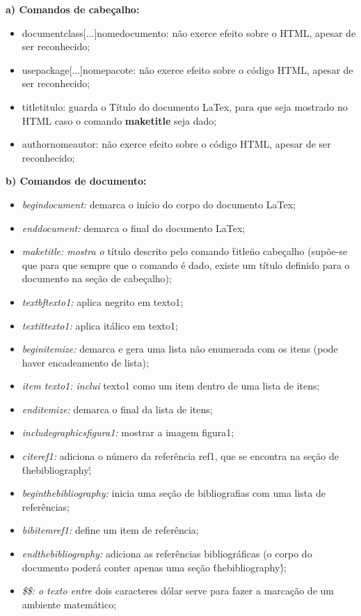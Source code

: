 \documentclass{article}
\begin{document}
\begin{itemzie}

	\item \textbf{a) Comandos de cabeçalho:}
		\begin{itemize}
			 \item documentclass[...]{nomedocumento}: não exerce efeito sobre o HTML, apesar de ser reconhecido;
			 \item usepackage[...]{nomepacote}:  não exerce efeito sobre o código HTML, apesar de ser reconhecido;
			 \item title{titulo}: guarda o Título do documento LaTex, para que seja mostrado no HTML caso o comando \textbf{maketitle} seja dado;
			 \item author{nomeautor}: não exerce efeito sobre o código HTML, apesar de ser reconhecido;
		\end{itemize}

	\item \textbf{b) Comandos de documento:}
		\begin{itemize}
	 		\item \textit{begin{document}:} demarca o início do corpo do documento LaTex;
	 		\item \textit{end{document}:} demarca o final do documento LaTex;
	 		\item \textit{maketitle: mostra o} título descrito pelo comando \"title\" no cabeçalho (supõe-se que para que sempre que o comando é dado, existe um título definido para o documento na seção de cabeçalho);
	 		\item \textit{textbf{texto1}:} aplica negrito em texto1;
	 		\item \textit{textit{texto1}:} aplica itálico em texto1;
	 		\item \textit{begin{itemize}:} demarca e gera uma lista não enumerada com os itens (pode haver encadeamento de lista);
	 		\item \textit{item texto1: inclui} texto1 como um item dentro de uma lista de itens; 
	 		\item \textit{end{itemize}:} demarca o final da lista de itens;
	 		\item \textit{includegraphics{figura1}:} mostrar a imagem figura1;
	 		\item \textit{cite{ref1}:} adiciona o número da referência ref1, que se encontra na seção de \'thebibliography\';
	 		\item \textit{begin{thebibliography}:} inicia uma seção de bibliografias com uma lista de referências;
	 		\item \textit{bibitem{ref1}:} define um item de referência;
	 		\item \textit{end{thebibliography}:} adiciona as referências bibliográficas (o corpo do documento poderá conter apenas uma seção \'thebibliography\');
	 		\item \textit{\$\$: o texto entre} dois caracteres dólar serve para fazer a marcação de um ambiente matemático;
		\end{itemize}


\end{itemzie}
\end{document}
